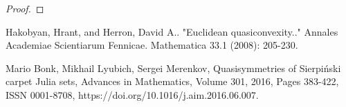\begin{proof}
\begin{comment}
This principle shows that all points $z$ on the Julia set $J(p_{c})$
are accessible, since after repeated applications of $f^{n}(B)$ we
get a topological ball of definite size which we may use to construct
an explicit path exiting $K$ in a rectifiable way.

\section{Accessibility in the Parabolic Case}

Let $f(z)=z^{2}+\frac{1}{4}$. Let $J=J(f)$ be the Julia set of $f$.
Let $K$ be the filled Julia set, known as the cauliflower.

\textbf{Claim. }The Cauliflower is bounded.

\textbf{Proof. }As in the hyperbolic case.$\square$

Using claim 1, fix $R>0$ for which $B(0,R)\supset K$. Denote $B=B(0,R)$.

Let $\zeta\in J$. Our goal is to show that $\zeta$ is accessible.

This is immediately equaivalent to showing that there is a rectifiable
curve $\Gamma$ starting at $\zeta$ that exits $B$.

The basic strategy will be to investigate the geometry near the main
cusp $p=\frac{1}{4}$, since all other cusps are preimages of $p$
under $f$,

whence the principle of the conformal elevator reduces the general
case to the case of a point sufficiently close to the main cusp $p$.

To implement this strategy, we take some arbitrary other point on
the Julia set, connect it by a curve $\gamma$ to $a$, then consider
all preimages of $\gamma$.

In general, consecutive images near a parabolic point have consecutive
distances comparable to $\frac{1}{n^{2}}$ , where $n$ is the index
of the preimage.
\end{comment}
\end{proof}
\begin{thebibliography}{1}
Hakobyan, Hrant, and Herron, David A.. "Euclidean
quasiconvexity.."{} Annales Academiae Scientiarum Fennicae.
Mathematica 33.1 (2008): 205-230.

Mario Bonk, Mikhail Lyubich, Sergei Merenkov, Quasisymmetries
of Sierpiński carpet Julia sets, Advances in Mathematics, Volume 301,
2016, Pages 383-422, ISSN 0001-8708, https://doi.org/10.1016/j.aim.2016.06.007.
\end{thebibliography}


